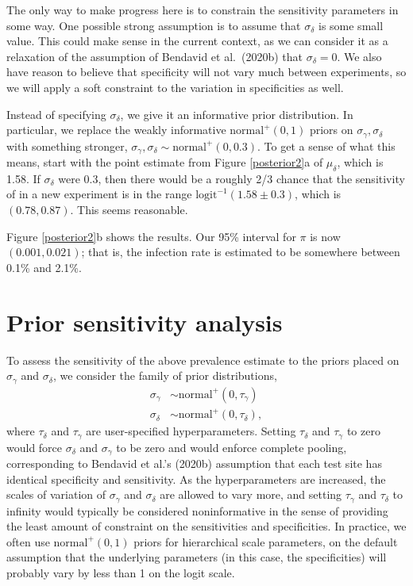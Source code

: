 \documentclass[11pt]{article}
\begin{document}
The only way to make progress here is to constrain the sensitivity
parameters in some way.  One possible strong assumption is to assume
that $\sigma_{\delta}$ is some small value.  This could make sense in
the current context, as we can consider it as a relaxation of the
assumption of Bendavid et al.\ (2020b) that $\sigma_{\delta} = 0$.  We
also have reason to believe that specificity will not vary much
between experiments, so we will apply a soft constraint to the
variation in specificities as well.

Instead of specifying $\sigma_{\delta}$, we give it an informative
prior distribution.  In particular, we replace the weakly informative
$\mbox{normal}^+(0, 1)$ priors on $\sigma_{\gamma},\sigma_{\delta}$
with something stronger,
$\sigma_{\gamma}, \sigma_{\delta}\sim\mbox{normal}^+(0, 0.3)$.  To get
a sense of what this means, start with the point estimate from Figure
\ref{posterior2}a of $\mu_{\delta}$, which is 1.58. If $\sigma_{\delta}$ were 0.3, then there would be a roughly 2/3 chance that the sensitivity of
in a new experiment is in the range
$\mbox{logit}^{-1}(1.58 \pm 0.3)$, which is $(0.78, 0.87)$. This seems reasonable.

Figure \ref{posterior2}b shows the results.  Our 95\% interval for
$\pi$ is now $(0.001, 0.021)$; that is, the infection rate is
estimated to be somewhere between 0.1\% and 2.1\%.

\section{Prior sensitivity analysis}

To assess the sensitivity of the above prevalence estimate to the
priors placed on $\sigma_{\gamma}$ and $\sigma_{\delta}$, we consider
the family of prior distributions,
%
\begin{align*}
  \sigma_{\gamma} & \sim \mbox{normal}^+(0, \tau_{\gamma})\\
\sigma_{\delta} & \sim  \mbox{normal}^+(0, \tau_{\delta}),
\end{align*}
%
where $\tau_{\delta} $ and $\tau_{\gamma} $ are user-specified
hyperparameters. Setting $\tau_{\delta}$ and $\tau_{\gamma}$ to zero
would force $\sigma_{\delta}$ and $\sigma_{\gamma}$ to be zero and
would enforce complete pooling, corresponding to Bendavid et al.'s
(2020b) assumption that each test site has identical specificity and
sensitivity. As the hyperparameters are increased, the scales of
variation of $\sigma_{\gamma}$ and $\sigma_{\delta}$ are allowed to
vary more, and setting $\tau_{\gamma}$ and $\tau_{\delta}$ to infinity
would typically be considered noninformative in the sense of providing
the least amount of constraint on the sensitivities and specificities.
In practice, we often use $\mbox{normal}^+(0,1)$ priors for
hierarchical scale parameters, on the default assumption that the
underlying parameters (in this case, the specificities) will probably
vary by less than 1 on the logit scale.
\end{document}
